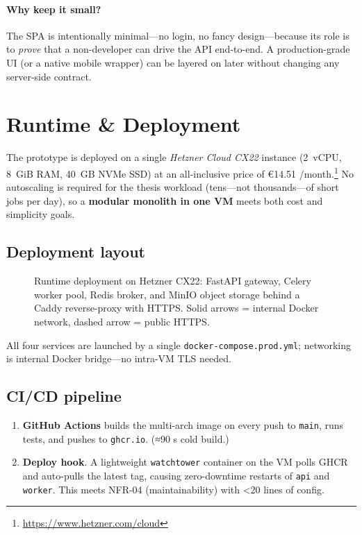 \paragraph{Why keep it small?}
The SPA is intentionally minimal—no login, no fancy design—because its role
is to \emph{prove} that a non-developer can drive the API end-to-end.  
A production-grade UI (or a native mobile wrapper) can be layered on later
without changing any server-side contract.

\section{Runtime \& Deployment}
\label{sec:impl-deploy}

The prototype is deployed on a single \emph{Hetzner Cloud CX22} instance
(\SI{2}{vCPU}, \SI{8}{GiB} RAM, \SI{40}{GB} NVMe SSD) at an all-inclusive
price of €14.51 \slash month.\footnote{\url{https://www.hetzner.com/cloud}}
No autoscaling is required for the thesis workload (tens—not
thousands—of short jobs per day), so a \textbf{modular monolith in one VM}
meets both cost and simplicity goals.

\subsection{Deployment layout}

\begin{figure}[htbp]
  \centering
  \fbox{\rule{0pt}{5cm}\rule{0.80\linewidth}{0pt}}
  \caption{Runtime deployment on Hetzner CX22: FastAPI gateway, Celery
           worker pool, Redis broker, and MinIO object storage behind a
           Caddy reverse-proxy with HTTPS.  Solid arrows = internal Docker
           network, dashed arrow = public HTTPS.}
  \label{fig:hetzner-deploy}
\end{figure}

All four services are launched by a single \texttt{docker-compose.prod.yml};
networking is internal Docker bridge—no
intra-VM TLS needed.

\subsection{CI/CD pipeline}

\begin{enumerate}
  \item \textbf{GitHub Actions} builds the multi-arch image
        on every push to \texttt{main}, runs tests, and pushes to
        \texttt{ghcr.io}. (≈90 s cold build.)
  \item \textbf{Deploy hook}.  
        A lightweight \texttt{watchtower} container on the VM polls GHCR and
        auto-pulls the latest tag, causing zero-downtime restarts of
        \texttt{api} and \texttt{worker}.  
        This meets NFR-04 (maintainability) with <20 lines of config.
\end{enumerate}

